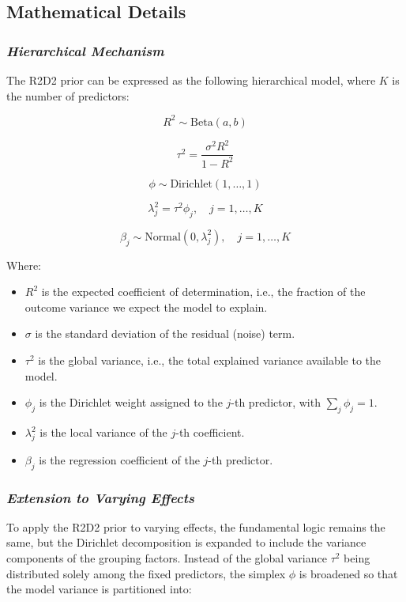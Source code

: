 \documentclass[
  letterpaper,
  DIV=11,
  numbers=noendperiod]{scrartcl}
\begin{document}
\subsection{Mathematical Details}\label{mathematical-details}

\subsubsection{\texorpdfstring{\emph{Hierarchical
Mechanism}}{Hierarchical Mechanism}}\label{hierarchical-mechanism}

The R2D2 prior can be expressed as the following hierarchical model,
where \(K\) is the number of predictors:

\[
R^2 \sim \text{Beta}(a, b)
\]

\[
\tau^2 = \frac{\sigma^2 R^2}{1 - R^2}
\]

\[
\phi \sim \text{Dirichlet}(1, \dots, 1)
\]

\[
\lambda_j^2 = \tau^2 \phi_j, \quad j = 1, \dots, K
\]

\[
\beta_j \sim \text{Normal}(0, \lambda_j^2), \quad j = 1, \dots, K
\]

Where:

\begin{itemize}
\item
  \(R^2\) is the expected coefficient of determination, i.e., the
  fraction of the outcome variance we expect the model to explain.
\item
  \(\sigma\) is the standard deviation of the residual (noise) term.
\item
  \(\tau^2\) is the global variance, i.e., the total explained variance
  available to the model.
\item
  \(\phi_j\) is the Dirichlet weight assigned to the \(j\)-th predictor,
  with \(\sum_j \phi_j = 1\).
\item
  \(\lambda_j^2\) is the local variance of the \(j\)-th coefficient.
\item
  \(\beta_j\) is the regression coefficient of the \(j\)-th predictor.
\end{itemize}

\subsubsection{\texorpdfstring{\emph{Extension to Varying
Effects}}{Extension to Varying Effects}}\label{extension-to-varying-effects}

To apply the R2D2 prior to varying effects, the fundamental logic
remains the same, but the Dirichlet decomposition is expanded to include
the variance components of the grouping factors. Instead of the global
variance \(\tau^2\) being distributed solely among the fixed predictors,
the simplex \(\phi\) is broadened so that the model variance is
partitioned into:
\end{document}
